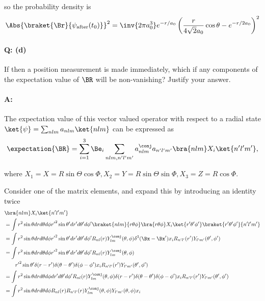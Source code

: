 {so the probability density is
\begin{equation}\label{eqn:qmIexamPractice2007Dec:4:300}
\Abs{\braket{\Br}{\psi_{\text{after}}(t_0)}}^2
= \inv{2 \pi a_0^3}
e^{-r/a_0}
\left(
\frac{r}{4\sqrt{2} a_0} \cos\theta
-e^{-r/2 a_0}
\right)^2
\end{equation}

\paragraph{Q: (d)}

If then a position measurement is made immediately, which if any components of the expectation value of \(\BR\) will be non-vanishing?  Justify your answer.

\paragraph{A:}

The expectation value of this vector valued operator with respect to a radial state \(\ket{\psi} = \sum_{nlm} a_{nlm} \ket{nlm}\) can be expressed as
%
\begin{equation}\label{eqn:qmIexamPractice2007Dec:4:400}
\expectation{\BR} = \sum_{i=1}^3 \Be_i \sum_{nlm, n'l'm'}
a_{nlm}^\conj a_{n'l'm'}
\bra{nlm} X_i
\ket{n'l'm'},
\end{equation}

where \(X_1 = X = R \sin\Theta \cos\Phi, X_2 = Y = R \sin\Theta \sin\Phi, X_3 = Z = R \cos\Phi\).

Consider one of the matrix elements, and expand this by introducing an identity twice
\begin{equation}\label{eqn:qmIexamPractice2007Dec:550}
\begin{aligned}
&\bra{nlm} X_i \ket{n'l'm'} \\
&=
\int
r^2 \sin\theta dr d\theta d\phi
{r'}^2 \sin\theta' dr' d\theta' d\phi'
\braket{nlm}{r \theta \phi} \bra{r \theta \phi} X_i \ket{r' \theta' \phi' }\braket{r' \theta' \phi'}{n'l'm'} \\
&=
\int
r^2 \sin\theta dr d\theta d\phi
{r'}^2 \sin\theta' dr' d\theta' d\phi'
R_{nl}(r) Y_{lm}^\conj(\theta,\phi)
\delta^3(\Bx - \Bx') x_i
R_{n'l'}(r') Y_{l'm'}(\theta',\phi')
\\
&=
\int
r^2 \sin\theta dr d\theta d\phi
{r'}^2 \sin\theta' dr' d\theta' d\phi'
R_{nl}(r) Y_{lm}^\conj(\theta,\phi) \\
&\qquad{r'}^2 \sin\theta' \delta(r-r') \delta(\theta - \theta') \delta(\phi-\phi')
x_i
R_{n'l'}(r') Y_{l'm'}(\theta',\phi')
\\
&=
\int
r^2 \sin\theta dr d\theta d\phi
dr' d\theta' d\phi'
R_{nl}(r) Y_{lm}^\conj(\theta,\phi)
\delta(r-r') \delta(\theta - \theta') \delta(\phi-\phi')
x_i
R_{n'l'}(r') Y_{l'm'}(\theta',\phi')
\\
&=
\int
r^2 \sin\theta dr d\theta d\phi
R_{nl}(r) R_{n'l'}(r)
Y_{lm}^\conj(\theta,\phi) Y_{l'm'}(\theta,\phi)
x_i
\\
\end{aligned}
\end{equation}

}

